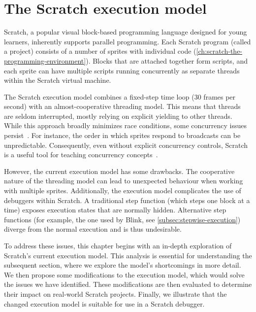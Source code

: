 \documentclass[../main]{subfiles}
\begin{document}
\chapter{The Scratch execution model}\label{ch:scratch-execution-model}


Scratch, a popular visual block-based programming language designed for young learners, inherently supports parallel programming.
Each Scratch program (called a project) consists of a number of sprites with individual code (\cref{ch:scratch-the-programming-environment}).
Blocks that are attached together form scripts, and each sprite can have multiple scripts running concurrently as separate threads within the Scratch virtual machine.

The Scratch execution model combines a fixed-step time loop (30 frames per second) with an almost-cooperative threading model.
This means that threads are seldom interrupted, mostly relying on explicit yielding to other threads.
While this approach broadly minimizes race conditions, some concurrency issues persist~\autocite{maloneyScratchProgrammingLanguage2010a}.
For instance, the order in which sprites respond to broadcasts can be unpredictable.
Consequently, even without explicit concurrency controls, Scratch is a useful tool for teaching concurrency concepts~\autocite{fatourouTeachingConcurrentProgramming2018}.

However, the current execution model has some drawbacks.
The cooperative nature of the threading model can lead to unexpected behaviour when working with multiple sprites.
Additionally, the execution model complicates the use of debuggers within Scratch.
A traditional step function (which steps one block at a time) exposes execution states that are normally hidden.
Alternative step functions (for example, the one used by Blink, see \cref{subsec:stepwise-execution}) diverge from the normal execution and is thus undesirable.

To address these issues, this chapter begins with an in-depth exploration of Scratch's current execution model.
This analysis is essential for understanding the subsequent section, where we explore the model's shortcomings in more detail.
We then propose some modifications to the execution model, which would solve the issues we have identified.
These modifications are then evaluated to determine their impact on real-world Scratch projects.
Finally, we illustrate that the changed execution model is suitable for use in a Scratch debugger.
\end{document}
